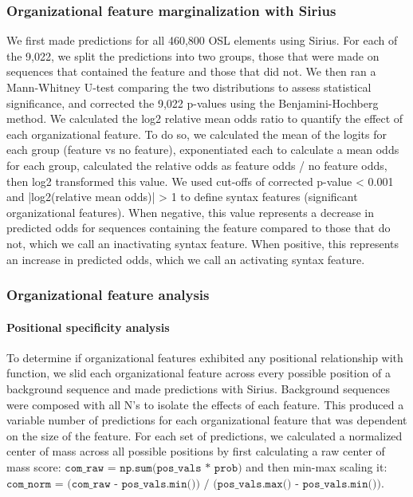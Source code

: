 \subsubsection{Organizational feature marginalization with Sirius}
We first made predictions for all 460,800 OSL elements using Sirius. For each of the 9,022, we split the predictions into two groups, those that were made on sequences that contained the feature and those that did not. We then ran a Mann-Whitney U-test comparing the two distributions to assess statistical significance, and corrected the 9,022 p-values using the Benjamini-Hochberg method. We calculated the log2 relative mean odds ratio to quantify the effect of each organizational feature. To do so, we calculated the mean of the logits for each group (feature vs no feature), exponentiated each to calculate a mean odds for each group, calculated the relative odds as feature odds / no feature odds, then log2 transformed this value. We used cut-offs of corrected p-value < 0.001 and |log2(relative mean odds)| > 1 to define syntax features (significant organizational features). When negative, this value represents a decrease in predicted odds for sequences containing the feature compared to those that do not, which we call an inactivating syntax feature. When positive, this represents an increase in predicted odds, which we call an activating syntax feature.

\subsubsection{Organizational feature analysis}

\paragraph{Positional specificity analysis}
To determine if organizational features exhibited any positional relationship with function, we slid each organizational feature across every possible position of a background sequence and made predictions with Sirius. Background sequences were composed with all N’s to isolate the effects of each feature. This produced a variable number of predictions for each organizational feature that was dependent on the size of the feature. For each set of predictions, we calculated a normalized center of mass across all possible positions by first calculating a raw center of mass score: \(\texttt{com\_raw = np.sum(pos\_vals * prob)}\) and then min-max scaling it: \(\texttt{com\_norm = (com\_raw - pos\_vals.min()) / (pos\_vals.max() - pos\_vals.min())}\).


